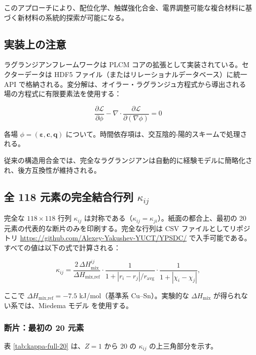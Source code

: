 \documentclass[11pt,a4paper]{article}
\theoremstyle{remark}
\begin{document}
	このアプローチにより、配位化学、触媒強化合金、電界調整可能な複合材料に基づく新材料の系統的探索が可能になる。
	
	\subsection{実装上の注意}
	\label{subsec:implementation}
	
	ラグランジアンフレームワークは PLCM コアの拡張として実装されている。セクターデータは HDF5 ファイル（またはリレーショナルデータベース）に統一 API で格納される。変分解は、オイラー・ラグランジュ方程式から導出される場の方程式に有限要素法を使用する：
	
	\[
	\frac{\partial \mathcal{L}}{\partial \phi} - \nabla \cdot \frac{\partial \mathcal{L}}{\partial (\nabla\phi)} = 0
	\]
	
	各場 \(\phi = (\boldsymbol{\varepsilon}, \mathbf{c}, \mathbf{q})\) について。時間依存項は、交互陰的-陽的スキームで処理される。
	
	従来の構造用合金では、完全なラグランジアンは自動的に経験モデルに簡略化され、後方互換性が維持される。
	
	\subsection{全 118 元素の完全結合行列 \(\kappa_{ij}\)}
	\label{subsec:full-kappa}
	
	完全な \(118\times118\) 行列 \(\kappa_{ij}\) は対称である（\(\kappa_{ij}=\kappa_{ji}\)）。紙面の都合上、最初の 20 元素の代表的な断片のみを印刷する。完全な行列は CSV ファイルとしてリポジトリ \url{https://github.com/Alexey-Yakushev-YUCT/YPSDC/} で入手可能である。すべての値は以下の式で計算される：
	
	\[
	\kappa_{ij} = \frac{2\,\Delta H_{\text{mix}}^{ij}}{\Delta H_{\text{mix,ref}}} \cdot
	\frac{1}{1 + |r_i - r_j|/r_{\text{avg}}} \cdot
	\frac{1}{1 + |\chi_i - \chi_j|},
	\]
	
	ここで \(\Delta H_{\text{mix,ref}} = -7.5\) kJ/mol（基準系 Cu–Sn）。実験的な \(\Delta H_{\text{mix}}\) が得られない系では、Miedema モデル \cite{Miedema1980} を使用する。
	
	\subsubsection*{断片：最初の 20 元素}
	表 \ref{tab:kappa-full-20} は、\(Z=1\) から \(20\) の \(\kappa_{ij}\) の上三角部分を示す。
	
\end{document}
